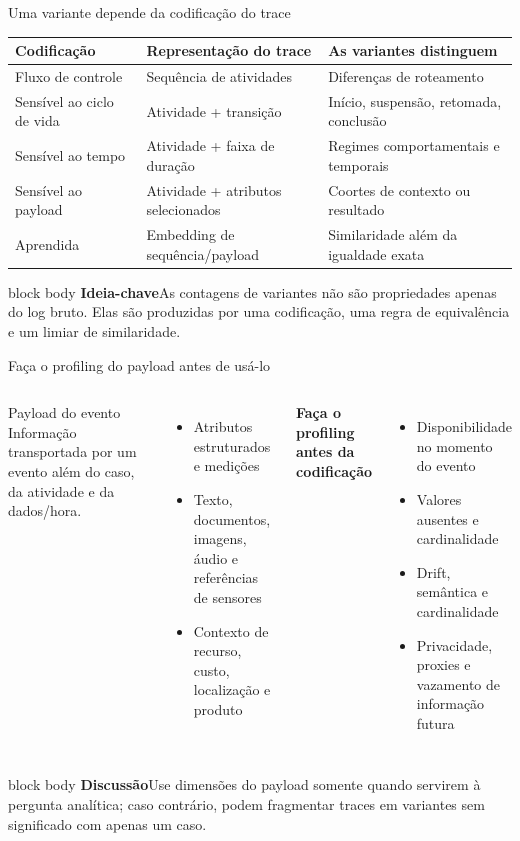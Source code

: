 \documentclass[aspectratio=169,11pt]{beamer}
\newcommand{\keyidea}[1]{%
  \begin{beamercolorbox}[rounded=true,sep=0.65em]{block body}
    \textbf{\color{Teal}Ideia-chave}\quad #1
  \end{beamercolorbox}
}
\newcommand{\promptbox}[1]{%
  \begin{beamercolorbox}[rounded=true,sep=0.65em]{block body}
    \textbf{\color{Coral}Discussão}\quad #1
  \end{beamercolorbox}
}
\begin{document}
\begin{frame}[shrink=3]{Uma variante depende da codificação do trace}
  \small
  \begin{tabular}{@{}
    >{\raggedright\arraybackslash}p{}
    >{\raggedright\arraybackslash}p{}
    >{\raggedright\arraybackslash}p{}@{}}
    \toprule
    Codificação & Representação do trace & As variantes distinguem\\
    \midrule
    Fluxo de controle & Sequência de atividades & Diferenças de roteamento\\
    Sensível ao ciclo de vida & Atividade + transição & Início, suspensão, retomada, conclusão\\
    Sensível ao tempo & Atividade + faixa de duração & Regimes comportamentais e temporais\\
    Sensível ao payload & Atividade + atributos selecionados & Coortes de contexto ou resultado\\
    Aprendida & Embedding de sequência/payload & Similaridade além da igualdade exata\\
    \bottomrule
  \end{tabular}
  \vspace{0.4cm}
  \keyidea{As contagens de variantes não são propriedades apenas do log bruto. Elas são produzidas por uma codificação, uma regra de equivalência e um limiar de similaridade.}
\end{frame}

\begin{frame}{Faça o profiling do payload antes de usá-lo}
  \small
  \begin{columns}[T,onlytextwidth]
      \begin{block}{Payload do evento}
        Informação transportada por um evento além do caso, da atividade e da dados/hora.
      \end{block}
      \begin{itemize}
        \item Atributos estruturados e medições
        \item Texto, documentos, imagens, áudio e referências de sensores
        \item Contexto de recurso, custo, localização e produto
      \end{itemize}
      \textbf{Faça o profiling antes da codificação}
      \begin{itemize}
        \item Disponibilidade no momento do evento
        \item Valores ausentes e cardinalidade
        \item Drift, semântica e cardinalidade
        \item Privacidade, proxies e vazamento de informação futura
      \end{itemize}
  \end{columns}
  \vspace{0.05cm}
  \promptbox{Use dimensões do payload somente quando servirem à pergunta analítica; caso contrário, podem fragmentar traces em variantes sem significado com apenas um caso.}
\end{frame}
\end{document}
